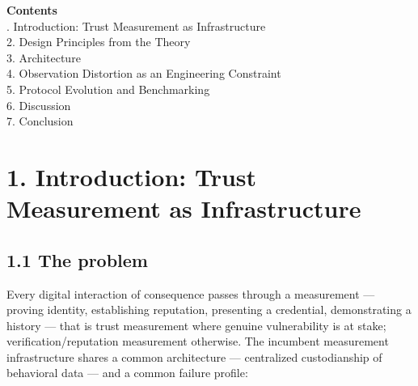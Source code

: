 \documentclass[11pt,twocolumn]{article}
\begin{document}
\medskip
\noindent\textbf{Contents}\\[3pt]
{\small{}. Introduction: Trust Measurement as Infrastructure\\
2. Design Principles from the Theory\\
3. Architecture\\
4. Observation Distortion as an Engineering Constraint\\
5. Protocol Evolution and Benchmarking\\
6. Discussion\\
7. Conclusion\\
}
\medskip



\FloatBarrier
\section*{1. Introduction: Trust Measurement as
Infrastructure}

\subsection*{1.1 The problem}

Every digital interaction of consequence passes through a measurement
--- proving identity, establishing reputation, presenting a
credential, demonstrating a history --- that is trust measurement where
genuine vulnerability is at stake; verification/reputation measurement
otherwise. The incumbent measurement
infrastructure shares a common architecture --- centralized
custodianship of behavioral data --- and a common failure profile:
\end{document}

